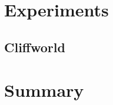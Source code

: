 


\section{Experiments}\label{sec:vi-experiments}


\subsection{Cliffworld}

\section{Summary}





